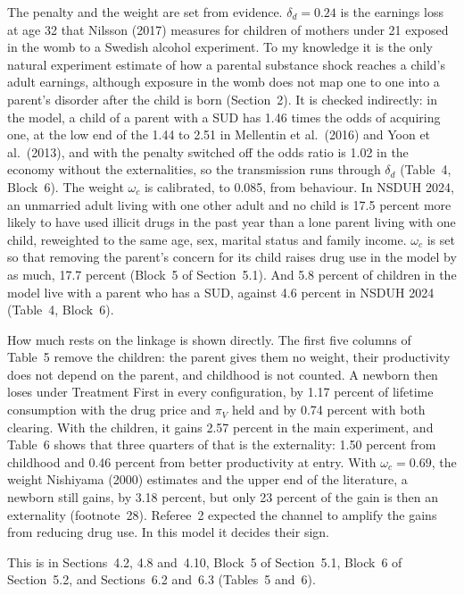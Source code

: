 \documentclass[11pt]{article}
\begin{document}
\begin{response}
The penalty and the weight are set from evidence. $\delta_d=0.24$ is the earnings
loss at age 32 that Nilsson (2017) measures for children of mothers under 21
exposed in the womb to a Swedish alcohol experiment. To my knowledge it is the only
natural experiment estimate of how a parental substance shock reaches a child's
adult earnings, although exposure in the womb does not map one to one into a
parent's disorder after the child is born (Section~2). It is checked indirectly: in
the model, a child of a parent with a SUD has 1.46 times the odds of acquiring one,
at the low end of the 1.44 to 2.51 in Mellentin et al.\ (2016) and Yoon et al.\
(2013), and with the penalty switched off the odds ratio is 1.02 in the economy
without the externalities, so the transmission runs through $\delta_d$ (Table~4,
Block~6). The weight $\omega_c$ is calibrated, to 0.085, from behaviour. In NSDUH
2024, an unmarried adult living with one other adult and no child is 17.5 percent
more likely to have used illicit drugs in the past year than a lone parent living
with one child, reweighted to the same age, sex, marital status and family income.
$\omega_c$ is set so that removing the parent's concern for its child raises drug
use in the model by as much, 17.7 percent (Block~5 of Section~5.1). And 5.8 percent
of children in the model live with a parent who has a SUD, against 4.6 percent in
NSDUH 2024 (Table~4, Block~6).

How much rests on the linkage is shown directly. The first five columns of
Table~5 remove the children: the parent gives them no weight, their productivity
does not depend on the parent, and childhood is not counted. A newborn then loses
under Treatment First in every configuration, by 1.17 percent of lifetime
consumption with the drug price and $\pi_V$ held and by 0.74 percent with both
clearing. With the children, it gains 2.57 percent in the main experiment, and
Table~6 shows that three quarters of that is the externality: 1.50 percent from
childhood and 0.46 percent from better productivity at entry. With
$\omega_c=0.69$, the weight Nishiyama (2000) estimates and the upper end of the
literature, a newborn still gains, by 3.18 percent, but only 23 percent of the gain
is then an externality (footnote~28). Referee~2 expected the channel to amplify the
gains from reducing drug use. In this model it decides their sign.

This is in Sections~4.2, 4.8 and~4.10, Block~5 of Section~5.1, Block~6 of
Section~5.2, and Sections~6.2 and~6.3 (Tables~5 and~6).
\end{response}
\end{document}
